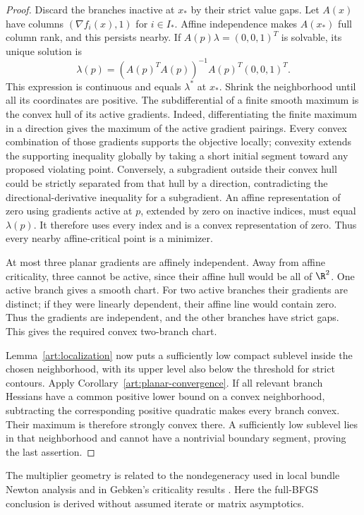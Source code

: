 \begin{proof}
Discard the branches inactive at $x_*$ by their strict value gaps. Let $A(x)$
have columns $(\nabla f_i(x),1)$ for $i\in I_*$. Affine independence makes
$A(x_*)$ full column rank, and this persists nearby. If
$A(p)\lambda=(0,0,1)^T$ is solvable, its unique solution is
\[
 \lambda(p)=(A(p)^TA(p))^{-1}A(p)^T(0,0,1)^T.
\]
This expression is continuous and equals $\lambda^*$ at $x_*$. Shrink the
neighborhood until all its coordinates are positive. The subdifferential
of a finite smooth maximum is the convex hull of its active gradients.
Indeed, differentiating the finite maximum in a direction gives the maximum
of the active gradient pairings. Every convex combination of those gradients
supports the objective locally; convexity extends the supporting inequality
globally by taking a short initial segment toward any proposed violating
point. Conversely, a subgradient outside their convex
hull could be strictly separated from that hull by a direction, contradicting
the directional-derivative inequality for a subgradient.
An affine representation of zero using gradients active at $p$, extended by
zero on inactive indices, must equal $\lambda(p)$. It therefore uses every
index and is a convex representation of zero. Thus every nearby
affine-critical point is a minimizer.

At most three planar gradients are affinely independent. Away from affine
criticality, three cannot be active, since their affine hull would be all of
$\R^2$. One active branch gives a smooth chart. For two active branches their
gradients are distinct; if they were linearly dependent, their affine line
would contain zero. Thus the gradients are independent, and the other
branches have strict gaps. This gives the required convex two-branch chart.

Lemma~\ref{art:localization} now puts a sufficiently low compact sublevel
inside the chosen neighborhood, with its upper level also below the threshold
for strict contours. Apply Corollary~\ref{art:planar-convergence}.
If all relevant branch Hessians have a common positive lower bound on a
convex neighborhood, subtracting the corresponding positive quadratic
makes every branch convex. Their maximum is therefore strongly convex
there. A sufficiently low sublevel lies in that neighborhood and cannot have
a nontrivial boundary segment, proving the last assertion.
\end{proof}

The multiplier geometry is related to the nondegeneracy used in local bundle
Newton analysis  and in Gebken's
criticality results \cite{BG}.
Here the full-BFGS conclusion is derived without assumed iterate or matrix
asymptotics.

